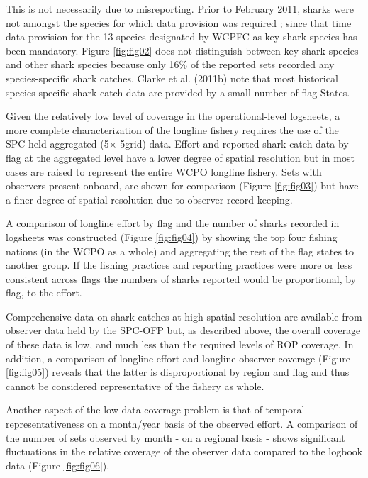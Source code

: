 \documentclass[12pt]{SCreport}
\begin{document}
This is not necessarily due to misreporting. Prior to February 2011, sharks were not amongst the species for which data provision was required \citep{WCPFC2011_a}; since that time data provision for the 13 species designated by WCPFC as key shark species has been mandatory. Figure \ref{fig:fig02} does not distinguish between key shark species and other shark species because only 16\% of the reported sets recorded any species-specific shark catches. Clarke et al. (2011b) note that most historical species-specific shark catch data are provided by a small number of flag States.

Given the relatively low level of coverage in the operational-level logsheets, a more complete characterization of the longline fishery requires the use of the SPC-held aggregated (5\degree $\times$ 5\degree grid) data. Effort and reported shark catch data by flag at the aggregated level have a lower degree of spatial resolution but in most cases are raised to represent the entire WCPO longline fishery. Sets with observers present onboard, are shown for comparison (Figure \ref{fig:fig03}) but have a finer degree of spatial resolution due to observer record keeping. 

A comparison of longline effort by flag and the number of sharks recorded in logsheets was constructed (Figure \ref{fig:fig04}) by showing the top four fishing nations (in the WCPO as a whole) and aggregating the rest of the flag states to another group. If the fishing practices and reporting practices were more or less consistent across flags the numbers of sharks reported would be proportional, by flag, to the effort.

Comprehensive data on shark catches at high spatial resolution are available from observer data held by the SPC-OFP but, as described above, the overall coverage of these data is low, and much less than the required levels of ROP coverage. In addition, a comparison of longline effort and longline observer coverage (Figure \ref{fig:fig05}) reveals that the latter is disproportional by region and flag and thus cannot be considered representative of the fishery as whole.

Another aspect of the low data coverage problem is that of temporal representativeness on a month/year basis of the observed effort. A comparison of the number of sets observed by month - on a regional basis - shows significant fluctuations in the relative coverage of the observer data compared to the logbook data (Figure \ref{fig:fig06}).
\end{document}
